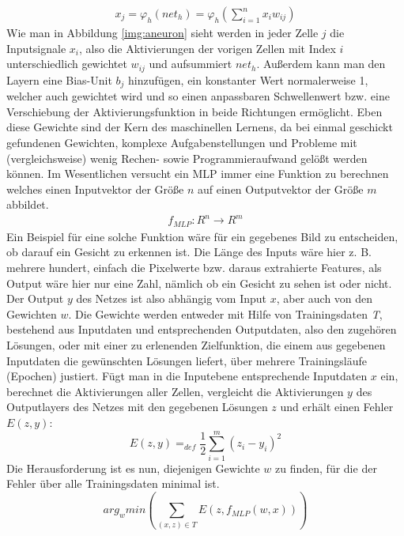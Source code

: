 \begin{gather}
x_{j} = \varphi_{h}(net_{h}) = \varphi_{h}(\sum_{i=1}^{n} x_{i}w_{ij}) 
\label{eq:act}
\end{gather}
Wie man in Abbildung \ref{img:aneuron} sieht werden in jeder Zelle \(j\) die Inputsignale \(x_{i}\), also die Aktivierungen der vorigen Zellen mit Index \(i\) unterschiedlich gewichtet \(w_{ij}\)  und aufsummiert \(net_{h}\). Außerdem kann man den Layern eine Bias-Unit $ b_{j} $ hinzufügen, ein konstanter Wert normalerweise 1, welcher auch gewichtet wird und so einen anpassbaren Schwellenwert bzw. eine Verschiebung der Aktivierungsfunktion in beide Richtungen ermöglicht. Eben diese Gewichte sind der Kern des maschinellen Lernens, da bei einmal geschickt gefundenen Gewichten, komplexe Aufgabenstellungen und Probleme mit (vergleichsweise) wenig Rechen- sowie Programmieraufwand gelößt werden können. Im Wesentlichen versucht ein MLP immer eine Funktion zu berechnen welches einen Inputvektor der Größe \(n\) auf einen Outputvektor der Größe \(m\) abbildet.
\begin{gather*}
f_{MLP}: R^n \to R^m 
\end{gather*}
Ein Beispiel für eine solche Funktion wäre für ein gegebenes Bild zu entscheiden, ob darauf ein Gesicht zu erkennen ist. Die Länge des Inputs wäre hier z. B. mehrere hundert, einfach die Pixelwerte bzw. daraus extrahierte Features, als Output wäre hier nur eine Zahl, nämlich ob ein Gesicht zu sehen ist oder nicht. Der Output \(y\) des Netzes ist also abhängig vom Input \(x\), aber auch von den Gewichten \(w\).
Die Gewichte werden entweder mit Hilfe von Trainingsdaten \textit{T}, bestehend aus Inputdaten und entsprechenden Outputdaten, also den zugehören Lösungen, oder mit einer zu erlenenden Zielfunktion, die einem aus gegebenen Inputdaten die gewünschten Lösungen liefert, über mehrere Trainingsläufe (Epochen) justiert. Fügt man in die Inputebene entsprechende Inputdaten \(x\) ein, berechnet die Aktivierungen aller Zellen, vergleicht die Aktivierungen \(y\) des Outputlayers des Netzes mit den gegebenen Lösungen \(z\) und erhält einen Fehler \( E(z,y)\): 
\begin{equation}
E(z,y) =_{def} \dfrac{1}{2} \sum_{i=1}^{m}(z_{i}-y_{i})^{2}
	\label{eq:err}
\end{equation}
Die Herausforderung ist es nun, diejenigen Gewichte \(w\) zu finden, für die der Fehler über alle Trainingsdaten minimal ist.
\begin{equation}
arg_{w} min( \sum_{(x,z)\in T} E(z,f_{MLP}(w,x)))
\label{eq:err}
\end{equation}
